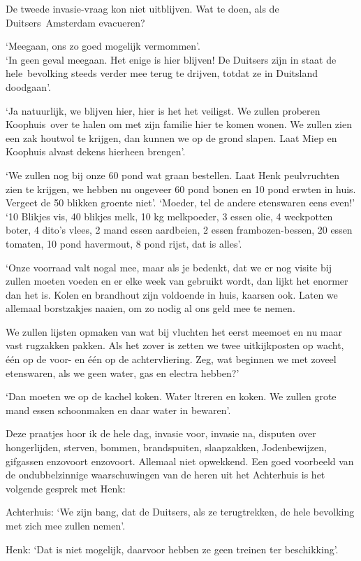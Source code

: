 \documentclass{book}
\begin{document}
De tweede invasie-vraag kon niet uitblijven. Wat te doen, als de
Duitsers~Amsterdam evacueren?

`Meegaan, ons zo goed mogelijk vermommen'.\\`In geen geval meegaan. Het
enige is hier blijven! De Duitsers zijn in staat de hele~bevolking
steeds verder mee terug te drijven, totdat ze in Duitsland doodgaan'.

`Ja natuurlijk, we blijven hier, hier is het het veiligst. We zullen
proberen Koophuis~over te halen om met zijn familie hier te komen wonen.
We zullen zien een zak houtwol te krijgen, dan kunnen we op de grond
slapen. Laat Miep en Koophuis alvast dekens hierheen brengen'.

`We zullen nog bij onze 60 pond wat graan bestellen. Laat Henk
peulvruchten zien te krijgen, we hebben nu ongeveer 60 pond bonen en 10
pond erwten in huis. Vergeet de 50 blikken groente niet'. `Moeder, tel
de andere etenswaren eens even!' `10 Blikjes vis, 40 blikjes melk, 10 kg
melkpoeder, 3 essen olie, 4 weckpotten boter, 4 dito's vlees, 2 mand
essen aardbeien, 2 essen frambozen-bessen, 20 essen tomaten, 10 pond
havermout, 8 pond rijst, dat is alles'.

`Onze voorraad valt nogal mee, maar als je bedenkt, dat we er nog visite
bij zullen moeten voeden en er elke week van gebruikt wordt, dan lijkt
het enormer dan het is. Kolen en brandhout zijn voldoende in huis,
kaarsen ook. Laten we allemaal borstzakjes naaien, om zo nodig al ons
geld mee te nemen.

We zullen lijsten opmaken van wat bij vluchten het eerst meemoet en nu
maar vast rugzakken pakken. Als het zover is zetten we twee
uitkijkposten op wacht, één op de voor- en één op de achtervliering.
Zeg, wat beginnen we met zoveel etenswaren, als we geen water, gas en
electra hebben?'

`Dan moeten we op de kachel koken. Water ltreren en koken. We zullen
grote mand essen schoonmaken en daar water in bewaren'.

Deze praatjes hoor ik de hele dag, invasie voor, invasie na, disputen
over hongerlijden, sterven, bommen, brandspuiten, slaapzakken,
Jodenbewijzen, gifgassen enzovoort enzovoort. Allemaal niet opwekkend.
Een goed voorbeeld van de ondubbelzinnige waarschuwingen van de heren
uit het Achterhuis is het volgende gesprek met Henk:

Achterhuis: `We zijn bang, dat de Duitsers, als ze terugtrekken, de hele
bevolking met zich mee zullen nemen'.

Henk: `Dat is niet mogelijk, daarvoor hebben ze geen treinen ter
beschikking'.
\end{document}
